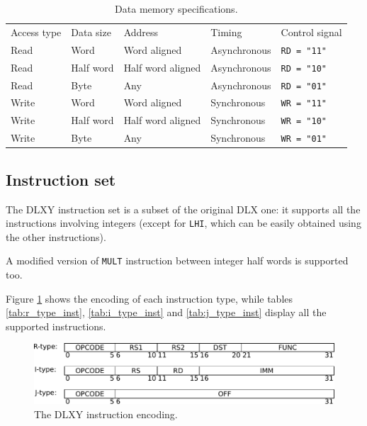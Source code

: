 \begin{table}[ht]
	\centering
	\begin{tabular}{lllll}
		\hline
		\rowcolor{gray!50}
		Access type & Data size & Address & Timing & Control signal \\
		Read & Word & Word aligned & Asynchronous & \texttt{RD = "11"} \\
		\rowcolor{gray!25}
		Read & Half word & Half word aligned & Asynchronous & \texttt{RD = "10"} \\
		Read & Byte & Any & Asynchronous & \texttt{RD = "01"} \\
		\rowcolor{gray!25}
		Write & Word & Word aligned & Synchronous & \texttt{WR = "11"} \\
		Write & Half word & Half word aligned & Synchronous & \texttt{WR = "10"} \\
		\rowcolor{gray!25}
		Write & Byte & Any & Synchronous & \texttt{WR = "01"} \\
		\hline
	\end{tabular}
	\caption{Data memory specifications.}
	\label{tab:d_mem_specs}
\end{table}

\subsection{Instruction set}
The DLXY instruction set is a subset of the original DLX one: it supports all
the instructions involving integers (except for \texttt{LHI}, which can be
easily obtained using the other instructions).

A modified version of \texttt{MULT} instruction between integer half words is
supported too.

\bigskip
Figure \ref{fig:encoding} shows the encoding of each instruction type, while
tables \ref{tab:r_type_inst}, \ref{tab:i_type_inst} and \ref{tab:j_type_inst}
display all the supported instructions.

\begin{figure}[ht]
	\centering
	\includegraphics[width=.75\textwidth]{chapters/figures/encoding} 
	\caption{The DLXY instruction encoding.}
	\label{fig:encoding}
\end{figure}

